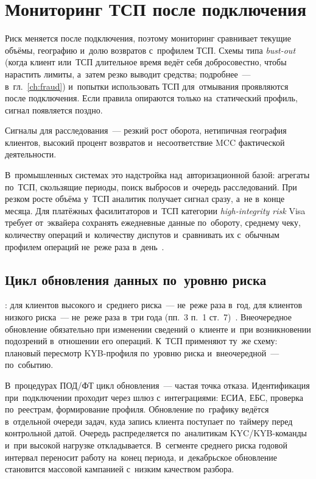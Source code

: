 \section{Мониторинг ТСП после подключения}\label{sec:merchant-monitoring}

Риск меняется после подключения, поэтому мониторинг сравнивает текущие объёмы,
географию и~долю возвратов с~профилем ТСП. Схемы типа \textit{bust-out}
(когда клиент или~ТСП длительное время ведёт себя добросовестно, чтобы
  нарастить лимиты, а~затем резко выводит средства; подробнее~---
в~гл.~\ref{ch:fraud}) и~попытки
использовать ТСП для~отмывания проявляются после подключения. Если правила
опираются только на~статический профиль, сигнал появляется поздно.

Сигналы для расследования~--- резкий рост оборота, нетипичная география
клиентов, высокий процент возвратов и~несоответствие MCC фактической
деятельности.

В~промышленных системах это надстройка над~авторизационной базой: агрегаты
по~ТСП, скользящие периоды, поиск выбросов и~очередь расследований.
При резком росте объёма у~ТСП аналитик получает сигнал сразу,
а~не в~конце месяца.
Для платёжных фасилитаторов и~ТСП категории \textit{high-integrity risk} Visa
требует от~эквайера сохранять ежедневные данные по~обороту, среднему чеку,
количеству операций и~количеству диспутов и~сравнивать их с~обычным профилем
операций не~реже раза в~день~\cite{visa-core-rules}.

\subsection*{Цикл обновления данных по~уровню риска}

: для клиентов высокого и~среднего риска~--- не~реже раза в~год, для
клиентов низкого риска~--- не~реже раза в~три года (пп.~3 п.~1 ст.~7)~\cite{fz-115}.
Внеочередное обновление обязательно при изменении сведений о~клиенте и~при
возникновении подозрений в~отношении его операций. К~ТСП применяют ту~же
схему: плановый пересмотр KYB-профиля по~уровню риска и~внеочередной~--- по~событию.

В~процедурах ПОД/ФТ цикл обновления~--- частая точка отказа. Идентификация
при~подключении проходит через шлюз с~интеграциями: ЕСИА, ЕБС, проверка
по~реестрам, формирование профиля. Обновление по~графику ведётся в~отдельной
очереди задач, куда запись клиента поступает по~таймеру перед контрольной
датой. Очередь распределяется по~аналитикам KYC/KYB-команды и~при высокой
нагрузке откладывается. В~сегменте среднего риска годовой интервал переносит
работу на~конец периода, и~декабрьское обновление становится массовой
кампанией с~низким качеством разбора.

